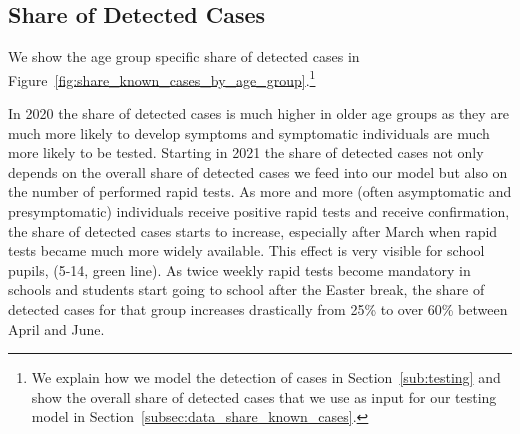 \subsection{Share of Detected Cases}
\label{subsec:results_share_known_cases}

We show the age group specific share of detected cases in
Figure~\ref{fig:share_known_cases_by_age_group}.\footnote{We explain how we model the
detection of cases in Section~\ref{sub:testing} and show the overall share of detected
cases that we use as input for our testing model in
Section~\ref{subsec:data_share_known_cases}.}

In 2020 the share of detected cases is much higher in older age groups as they are much
more likely to develop symptoms and symptomatic individuals are much more likely to be
tested. Starting in 2021 the share of detected cases not only depends on the overall
share of detected cases we feed into our model but also on the number of performed rapid
tests. As more and more (often asymptomatic and presymptomatic) individuals receive
positive rapid tests and receive confirmation, the share of detected cases starts to
increase, especially after March when rapid tests became much more widely available. This
effect is very visible for school pupils, (5-14, green line). As twice weekly rapid tests
become mandatory in schools and students start going to school after the Easter break,
the share of detected cases for that group increases drastically from 25\% to over 60\%
between April and June.


